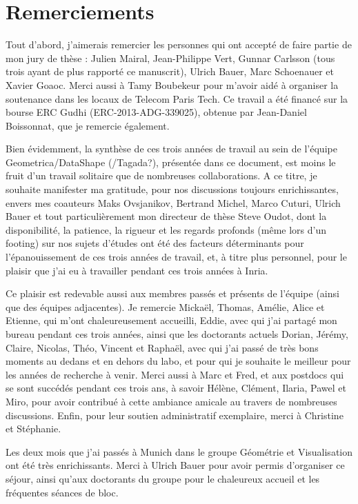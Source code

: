 \chapter*{Remerciements}

Tout d'abord, j'aimerais remercier les personnes qui ont accept\'e de faire partie de mon jury de th\`ese : Julien Mairal, Jean-Philippe Vert,
Gunnar Carlsson (tous trois ayant de plus rapport\'e ce manuscrit), Ulrich Bauer, Marc Schoenauer et Xavier Goaoc. Merci aussi
\`a Tamy Boubekeur pour m'avoir aid\'e \`a organiser la soutenance dans les locaux de Telecom Paris Tech. Ce travail a \'et\'e financ\'e
sur la bourse ERC Gudhi (ERC-2013-ADG-339025), obtenue par Jean-Daniel Boissonnat, que je remercie \'egalement.
 
 
Bien \'evidemment, la synth\`ese de ces trois ann\'ees de travail au sein de l'\'equipe Geometrica/DataShape (/Tagada?),
pr\'esent\'ee dans ce document, est moins le fruit d'un travail solitaire que de nombreuses collaborations.
A ce titre, je souhaite manifester ma gratitude, pour nos discussions toujours enrichissantes,
envers mes coauteurs Maks Ovsjanikov, Bertrand Michel, Marco Cuturi, Ulrich Bauer 
et tout particuli\`erement mon directeur de th\`ese Steve Oudot, dont la disponibilit\'e, la patience, la rigueur 
et les regards profonds (m\^eme lors d'un footing) sur nos sujets d'\'etudes ont \'et\'e des facteurs d\'eterminants pour 
l'\'epanouissement de ces trois ann\'ees de travail, et, \`a titre plus personnel, pour le plaisir que j'ai eu \`a travailler
pendant ces trois ann\'ees \`a Inria.

Ce plaisir est redevable aussi aux membres pass\'es et pr\'esents de l'\'equipe (ainsi que des \'equipes adjacentes).
Je remercie Micka\"el, Thomas, Am\'elie, Alice et Etienne, qui m'ont chaleureusement accueilli, Eddie, avec qui j'ai partag\'e mon bureau pendant ces trois
ann\'ees, ainsi que les doctorants actuels Dorian, J\'er\'emy, Claire, Nicolas, Th\'eo, Vincent et Rapha\"el, avec qui j'ai pass\'e de 
tr\`es bons moments au dedans et en dehors du labo, et pour qui je souhaite le meilleur pour les ann\'ees de recherche \`a venir. 
Merci aussi \`a Marc et Fred, et aux postdocs qui se sont succ\'ed\'es pendant ces trois ans, \`a savoir H\'el\`ene, Cl\'ement, Ilaria, Pawel et Miro,
pour avoir contribu\'e \`a cette ambiance amicale au travers de nombreuses discussions. Enfin, 
pour leur soutien administratif exemplaire, merci \`a Christine et St\'ephanie. 

Les deux mois que j'ai pass\'es \`a Munich dans le groupe G\'eom\'etrie et Visualisation ont \'et\'e tr\`es enrichissants. Merci \`a Ulrich Bauer pour avoir
permis d'organiser ce s\'ejour, ainsi qu'aux doctorants du groupe pour le chaleureux accueil et les fr\'equentes s\'eances de bloc.    

